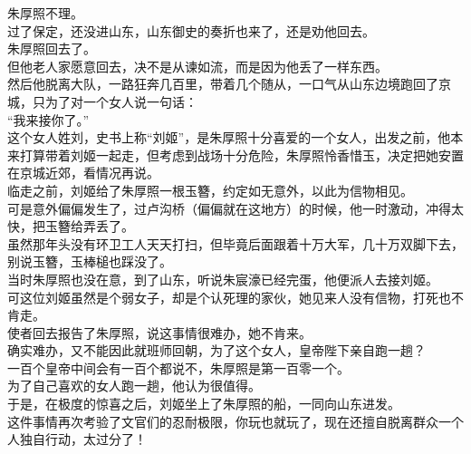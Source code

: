 \begin{multicols}{\theparacolNo}
朱厚照不理。\\

过了保定，还没进山东，山东御史的奏折也来了，还是劝他回去。\\

朱厚照回去了。\\

但他老人家愿意回去，决不是从谏如流，而是因为他丢了一样东西。\\

然后他脱离大队，一路狂奔几百里，带着几个随从，一口气从山东边境跑回了京城，只为了对一个女人说一句话：\\

“我来接你了。”\\

这个女人姓刘，史书上称“刘姬”，是朱厚照十分喜爱的一个女人，出发之前，他本来打算带着刘姬一起走，但考虑到战场十分危险，朱厚照怜香惜玉，决定把她安置在京城近郊，看情况再说。\\

临走之前，刘姬给了朱厚照一根玉簪，约定如无意外，以此为信物相见。\\

可是意外偏偏发生了，过卢沟桥（偏偏就在这地方）的时候，他一时激动，冲得太快，把玉簪给弄丢了。\\

虽然那年头没有环卫工人天天打扫，但毕竟后面跟着十万大军，几十万双脚下去，别说玉簪，玉棒槌也踩没了。\\

当时朱厚照也没在意，到了山东，听说朱宸濠已经完蛋，他便派人去接刘姬。\\

可这位刘姬虽然是个弱女子，却是个认死理的家伙，她见来人没有信物，打死也不肯走。\\

使者回去报告了朱厚照，说这事情很难办，她不肯来。\\

确实难办，又不能因此就班师回朝，为了这个女人，皇帝陛下亲自跑一趟？\\

一百个皇帝中间会有一百个都说不，朱厚照是第一百零一个。\\

为了自己喜欢的女人跑一趟，他认为很值得。\\

于是，在极度的惊喜之后，刘姬坐上了朱厚照的船，一同向山东进发。\\

这件事情再次考验了文官们的忍耐极限，你玩也就玩了，现在还擅自脱离群众一个人独自行动，太过分了！\\


\end{multicols}
